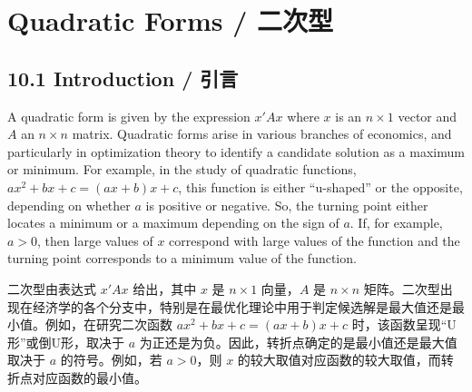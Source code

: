 

\section{Quadratic Forms / 二次型}

\subsection{10.1 Introduction / 引言}

\begin{original}
A quadratic form is given by the expression $x'Ax$ where $x$ is an $n \times 1$ vector and $A$ an $n \times n$ matrix. Quadratic forms arise in various branches of economics, and particularly in optimization theory to identify a candidate solution as a maximum or minimum. For example, in the study of quadratic functions, $ax^2 + bx + c = (ax + b)x + c$, this function is either ``u-shaped'' or the opposite, depending on whether $a$ is positive or negative. So, the turning point either locates a minimum or a maximum depending on the sign of $a$. If, for example, $a > 0$, then large values of $x$ correspond with large values of the function and the turning point corresponds to a minimum value of the function.
\end{original}
\begin{translation}
二次型由表达式 $x'Ax$ 给出，其中 $x$ 是 $n \times 1$ 向量，$A$ 是 $n \times n$ 矩阵。二次型出现在经济学的各个分支中，特别是在最优化理论中用于判定候选解是最大值还是最小值。例如，在研究二次函数 $ax^2 + bx + c = (ax + b)x + c$ 时，该函数呈现``U形''或倒U形，取决于 $a$ 为正还是为负。因此，转折点确定的是最小值还是最大值取决于 $a$ 的符号。例如，若 $a > 0$，则 $x$ 的较大取值对应函数的较大取值，而转折点对应函数的最小值。
\end{translation}

